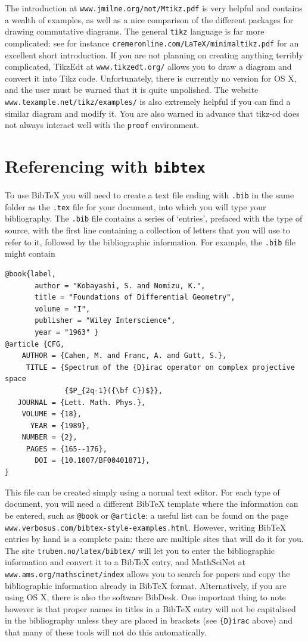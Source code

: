 \documentclass[11pt]{article}
\begin{document}
The introduction at \texttt{www.jmilne.org/not/Mtikz.pdf} is very helpful and contains a wealth of examples, as well as a nice comparison of the different packages for drawing commutative diagrams. The general \texttt{tikz} language is far more complicated: see for instance \verb$cremeronline.com/LaTeX/minimaltikz.pdf$ for an excellent short introduction. If you are not planning on creating anything terribly complicated, TikzEdt at \verb$www.tikzedt.org/$ allows you to draw a diagram and convert it into Tikz code. Unfortunately, there is currently no version for OS X, and the user must be warned that it is quite unpolished. The website \verb$www.texample.net/tikz/examples/$ is also extremely helpful if you can find a similar diagram and modify it. You are also warned in advance that tikz-cd does not always interact well with the \texttt{proof} environment. 

\section{Referencing with \texttt{bibtex}}

To use BibTeX you will need to create a text file ending with \verb$.bib$ in the same folder as the \verb$.tex$ file for your document, into which you will type your bibliography. The \verb$.bib$ file contains a series of `entries', prefaced with the type of source, with the first line containing a collection of letters that you will use to refer to it, followed by the bibliographic information. For example, the \verb$.bib$ file might contain
\begin{verbatim}
@book{label,
       author = "Kobayashi, S. and Nomizu, K.",
       title = "Foundations of Differential Geometry",
       volume = "I",
       publisher = "Wiley Interscience",
       year = "1963" }
@article {CFG,
    AUTHOR = {Cahen, M. and Franc, A. and Gutt, S.},
     TITLE = {Spectrum of the {D}irac operator on complex projective space
              {$P_{2q-1}({\bf C})$}},
   JOURNAL = {Lett. Math. Phys.},
    VOLUME = {18},
      YEAR = {1989},
    NUMBER = {2},
     PAGES = {165--176},
       DOI = {10.1007/BF00401871},
}	
\end{verbatim}

This file can be created simply using a normal text editor. For each type of document, you will need a different BibTeX template where the information can be entered, such as \verb$@book$ or \verb$@article$: a useful list can be found on the page \verb$www.verbosus.com/bibtex-style-examples.html$. However, writing BibTeX entries by hand is a complete pain: there are multiple sites that will do it for you. The site \verb$truben.no/latex/bibtex/$ will let you to enter the bibliographic information and convert it to a BibTeX entry, and MathSciNet at \verb$www.ams.org/mathscinet/index$ allows you to search for papers and copy the bibliographic information already in BibTeX format. Alternatively, if you are using OS X, there is also the software BibDesk. One important thing to note however is that proper names in titles in a BibTeX entry will not be capitalised in the bibliography unless they are placed in brackets (see \verb${D}irac$ above) and that many of these tools will not do this automatically.
\end{document}
